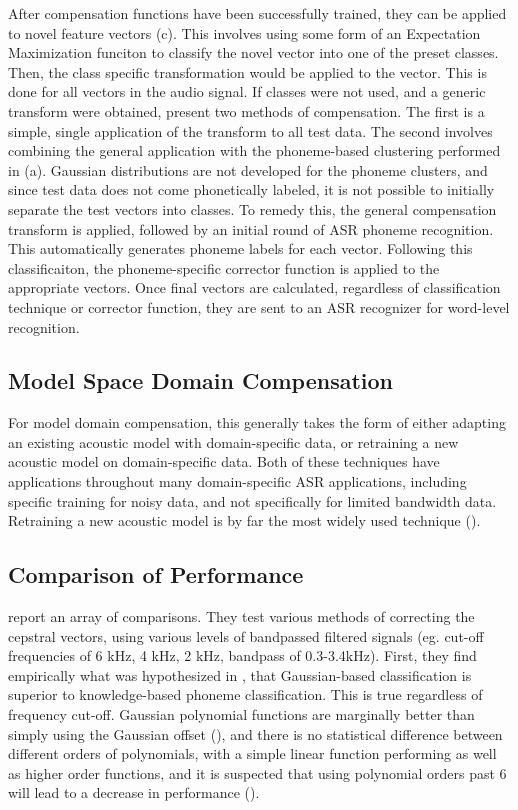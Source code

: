 After compensation functions have been successfully trained, they can be applied to novel feature vectors (c).  This involves using some form of an Expectation Maximization funciton to classify the novel vector into one of the preset classes.  Then, the class specific transformation would be applied to the vector.  This is done for all vectors in the audio signal.  If classes were not used, and a generic transform were obtained, \cite{morales:09} present two methods of compensation.  The first is a simple, single application of the transform to all test data.  The second involves combining the general application with the phoneme-based clustering performed in (a).  Gaussian distributions are not developed for the phoneme clusters, and since test data does not come phonetically labeled, it is not possible to initially separate the test vectors into classes.  To remedy this, the general compensation transform is applied, followed by an initial round of ASR phoneme recognition.  This automatically generates phoneme labels for each vector.  Following this classificaiton, the phoneme-specific corrector function is applied to the appropriate vectors.  Once final vectors are calculated, regardless of classification technique or corrector function, they are sent to an ASR recognizer for word-level recognition.


\subsection{Model Space Domain Compensation}\label{sec:mod-space-comp}

For model domain compensation, this generally takes the form of either adapting an existing acoustic model with domain-specific data, or retraining a new acoustic model on domain-specific data.  Both of these techniques have applications throughout many domain-specific ASR applications, including specific training for noisy data, and not specifically for limited bandwidth data.  Retraining a new acoustic model is by far the most widely used technique (\cite{morales:09}).

\subsection{Comparison of Performance}

\cite{morales:09} report an array of comparisons.  They test various methods of correcting the cepstral vectors, using various levels of bandpassed filtered signals (eg. cut-off frequencies of 6 kHz, 4 kHz, 2 kHz, bandpass of 0.3-3.4kHz).  First, they find empirically what was hypothesized in \cite{morales:05b}, that Gaussian-based classification is superior to knowledge-based phoneme classification.  This is true regardless of frequency cut-off.  Gaussian polynomial functions are marginally better than simply using the Gaussian offset (\cite{morales:05b}), and there is no statistical difference between different orders of polynomials, with a simple linear function performing as well as higher order functions, and it is suspected that using polynomial orders past 6 will lead to a decrease in performance (\cite{morales:09}).


